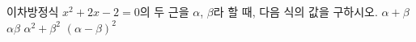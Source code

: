 이차방정식 $x^2+2x-2=0$의 두 근을 $\alpha$, $\beta$라 할 때, 다음 식의 값을 구하시오.
 $\alpha+\beta$
 $\alpha\beta$
 $\alpha^2+\beta^2$
 $(\alpha-\beta)^2$

